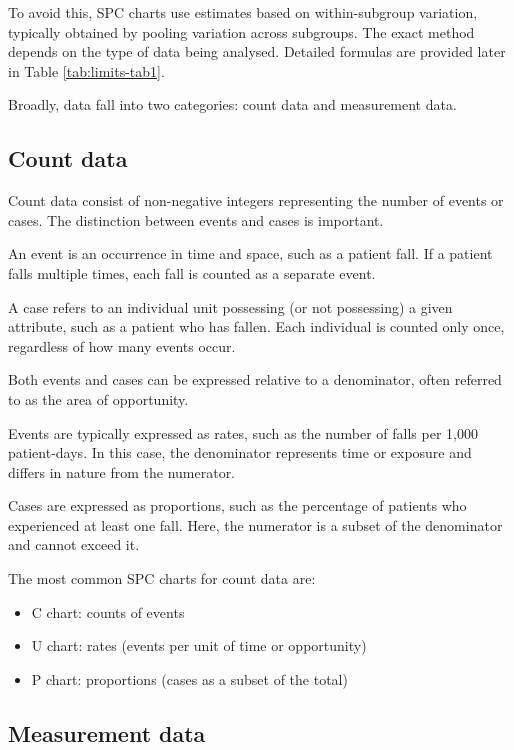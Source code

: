 \documentclass[
]{book}
\providecommand{\tightlist}{%
  \setlength{\itemsep}{0pt}\setlength{\parskip}{0pt}}
\begin{document}
To avoid this, SPC charts use estimates based on within-subgroup variation, typically obtained by pooling variation across subgroups. The exact method depends on the type of data being analysed. Detailed formulas are provided later in Table \ref{tab:limits-tab1}.

Broadly, data fall into two categories: count data and measurement data.

\subsection{Count data}\label{count-data}

Count data consist of non-negative integers representing the number of events or cases. The distinction between events and cases is important.

An event is an occurrence in time and space, such as a patient fall. If a patient falls multiple times, each fall is counted as a separate event.

A case refers to an individual unit possessing (or not possessing) a given attribute, such as a patient who has fallen. Each individual is counted only once, regardless of how many events occur.

Both events and cases can be expressed relative to a denominator, often referred to as the area of opportunity.

Events are typically expressed as rates, such as the number of falls per 1,000 patient-days. In this case, the denominator represents time or exposure and differs in nature from the numerator.

Cases are expressed as proportions, such as the percentage of patients who experienced at least one fall. Here, the numerator is a subset of the denominator and cannot exceed it.

The most common SPC charts for count data are:

\begin{itemize}
\tightlist
\item
  C chart: counts of events
\item
  U chart: rates (events per unit of time or opportunity)
\item
  P chart: proportions (cases as a subset of the total)
\end{itemize}

\subsection{Measurement data}\label{measurement-data}
\end{document}
